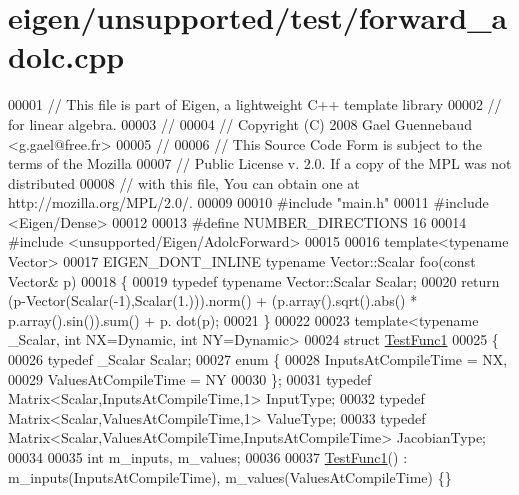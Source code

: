 \hypertarget{eigen_2unsupported_2test_2forward__adolc_8cpp_source}{}\section{eigen/unsupported/test/forward\+\_\+adolc.cpp}
\label{eigen_2unsupported_2test_2forward__adolc_8cpp_source}

\begin{DoxyCode}
00001 \textcolor{comment}{// This file is part of Eigen, a lightweight C++ template library}
00002 \textcolor{comment}{// for linear algebra.}
00003 \textcolor{comment}{//}
00004 \textcolor{comment}{// Copyright (C) 2008 Gael Guennebaud <g.gael@free.fr>}
00005 \textcolor{comment}{//}
00006 \textcolor{comment}{// This Source Code Form is subject to the terms of the Mozilla}
00007 \textcolor{comment}{// Public License v. 2.0. If a copy of the MPL was not distributed}
00008 \textcolor{comment}{// with this file, You can obtain one at http://mozilla.org/MPL/2.0/.}
00009 
00010 \textcolor{preprocessor}{#include "main.h"}
00011 \textcolor{preprocessor}{#include <Eigen/Dense>}
00012 
00013 \textcolor{preprocessor}{#define NUMBER\_DIRECTIONS 16}
00014 \textcolor{preprocessor}{#include <unsupported/Eigen/AdolcForward>}
00015 
00016 \textcolor{keyword}{template}<\textcolor{keyword}{typename} Vector>
00017 EIGEN\_DONT\_INLINE \textcolor{keyword}{typename} Vector::Scalar foo(\textcolor{keyword}{const} Vector& p)
00018 \{
00019   \textcolor{keyword}{typedef} \textcolor{keyword}{typename} Vector::Scalar Scalar;
00020   \textcolor{keywordflow}{return} (p-Vector(Scalar(-1),Scalar(1.))).norm() + (p.array().sqrt().abs() * p.array().sin()).sum() + p.
      dot(p);
00021 \}
00022 
00023 \textcolor{keyword}{template}<\textcolor{keyword}{typename} \_Scalar, \textcolor{keywordtype}{int} NX=Dynamic, \textcolor{keywordtype}{int} NY=Dynamic>
00024 \textcolor{keyword}{struct }\hyperlink{struct_test_func1}{TestFunc1}
00025 \{
00026   \textcolor{keyword}{typedef} \_Scalar Scalar;
00027   \textcolor{keyword}{enum} \{
00028     InputsAtCompileTime = NX,
00029     ValuesAtCompileTime = NY
00030   \};
00031   \textcolor{keyword}{typedef} Matrix<Scalar,InputsAtCompileTime,1> InputType;
00032   \textcolor{keyword}{typedef} Matrix<Scalar,ValuesAtCompileTime,1> ValueType;
00033   \textcolor{keyword}{typedef} Matrix<Scalar,ValuesAtCompileTime,InputsAtCompileTime> JacobianType;
00034 
00035   \textcolor{keywordtype}{int} m\_inputs, m\_values;
00036 
00037   \hyperlink{struct_test_func1}{TestFunc1}() : m\_inputs(InputsAtCompileTime), m\_values(ValuesAtCompileTime) \{\}

\end{DoxyCode}

